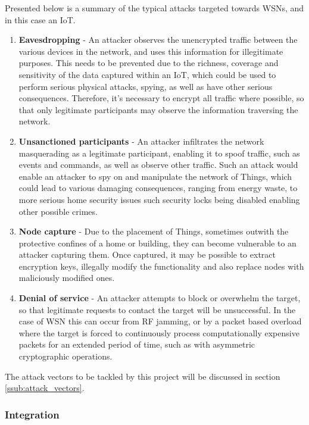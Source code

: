 \documentclass{mprop}
\begin{document}
Presented below is a summary of the typical attacks targeted towards WSNs, and in this case an IoT.
\begin{enumerate}
  \item \textbf{Eavesdropping} - An attacker observes the unencrypted traffic between the various devices in the network, and uses this information for illegitimate purposes. This needs to be prevented due to the richness, coverage and sensitivity of the data captured within an IoT, which could be used to perform serious physical attacks, spying, as well as have other serious consequences. Therefore, it's necessary to encrypt all traffic where possible, so that only legitimate participants may observe the information traversing the network.
  \item \textbf{Unsanctioned participants} - An attacker infiltrates the network masquerading as a legitimate participant, enabling it to spoof traffic, such as events and commands, as well as observe other traffic. Such an attack would enable an attacker to spy on and manipulate the network of Things, which could lead to various damaging consequences, ranging from energy waste, to more serious home security issues such security locks being disabled enabling other possible crimes.
  \item \textbf{Node capture} - Due to the placement of Things, sometimes outwith the protective confines of a home or building, they can become vulnerable to an attacker capturing them. Once captured, it may be possible to extract encryption keys, illegally modify the functionality and also replace nodes with maliciously modified ones.
  \item \textbf{Denial of service} - An attacker attempts to block or overwhelm the target, so that legitimate requests to contact the target will be unsuccessful. In the case of WSN this can occur from RF jamming, or by a packet based overload where the target is forced to continuously process computationally expensive packets for an extended period of time, such as with asymmetric cryptographic operations. 
\end{enumerate}

The attack vectors to be tackled by this project will be discussed in section \ref{ssub:attack_vectors}.


\subsubsection{Integration} %
\label{ssub:integration}
\end{document}
